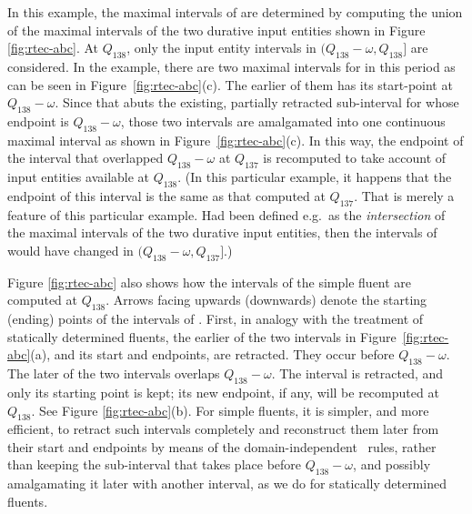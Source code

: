 In this example, the maximal intervals of  are determined by computing the union of the maximal intervals of the two durative input entities shown in Figure \ref{fig:rtec-abc}. At $Q_{138}$, only the input entity intervals in $(Q_{138}{-}\omega, Q_{138}]$ are considered. In the example, there are two maximal intervals for  in this period as can be seen in Figure~\ref{fig:rtec-abc}(c). The earlier of them has its start-point at $Q_{138}{-}\omega$. Since that abuts the existing, partially retracted sub-interval for  whose endpoint is $Q_{138}{-}\omega$, those two intervals are amalgamated into one continuous maximal interval as shown in Figure~\ref{fig:rtec-abc}(c). In this way, the endpoint of the  interval that overlapped $Q_{138}{-}\omega$ at $Q_{137}$ is recomputed to take account of input entities available at $Q_{138}$. (In this particular example, it happens that the endpoint of this interval is the same as that computed at $Q_{137}$. That is merely a feature of this particular example. Had  been defined e.g.~as the \emph{intersection} of the maximal intervals of the two durative input entities, then the intervals of  would have changed in $(Q_{138}{-}\omega, Q_{137}]$.)
 

Figure \ref{fig:rtec-abc} also shows how the intervals of the simple fluent  are computed at $Q_{138}$. Arrows facing upwards (downwards) denote the starting (ending) points of the intervals of . 
First, in analogy with the treatment of statically determined fluents, the earlier of the two    intervals in Figure~\ref{fig:rtec-abc}(a), and its start and endpoints, are retracted. They occur before $Q_{138}{-}\omega$. The later of the two intervals overlaps $Q_{138}{-}\omega$. The interval is retracted, and only its starting point is kept; its new endpoint, if any, will be recomputed at $Q_{138}$. See Figure \ref{fig:rtec-abc}(b). For simple fluents, it is simpler, and more efficient, to retract such intervals completely and reconstruct them later from their start and endpoints by means of the domain-independent \holdsFor\ rules, rather than keeping the sub-interval that takes place before $Q_{138}{-}\omega$, and possibly amalgamating it later with another interval, as we do for statically determined fluents.
%
%

